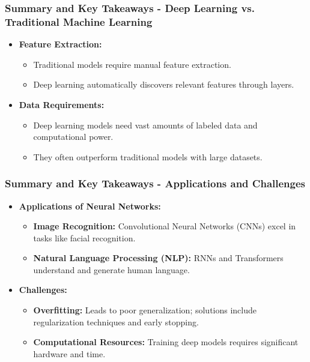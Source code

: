 \documentclass[aspectratio=169]{beamer}
\begin{document}
\begin{frame}[fragile]
  \frametitle{Summary and Key Takeaways - Deep Learning vs. Traditional Machine Learning}
  \begin{itemize}
    \item \textbf{Feature Extraction:} 
      \begin{itemize}
        \item Traditional models require manual feature extraction.
        \item Deep learning automatically discovers relevant features through layers.
      \end{itemize}
    \item \textbf{Data Requirements:} 
      \begin{itemize}
        \item Deep learning models need vast amounts of labeled data and computational power.
        \item They often outperform traditional models with large datasets.
      \end{itemize}
  \end{itemize}
\end{frame}

\begin{frame}[fragile]
  \frametitle{Summary and Key Takeaways - Applications and Challenges}
  \begin{itemize}
    \item \textbf{Applications of Neural Networks:}
    \begin{itemize}
      \item \textbf{Image Recognition:} Convolutional Neural Networks (CNNs) excel in tasks like facial recognition.
      \item \textbf{Natural Language Processing (NLP):} RNNs and Transformers understand and generate human language.
    \end{itemize}
    \item \textbf{Challenges:}
    \begin{itemize}
      \item \textbf{Overfitting:} Leads to poor generalization; solutions include regularization techniques and early stopping.
      \item \textbf{Computational Resources:} Training deep models requires significant hardware and time.
    \end{itemize}
  \end{itemize}
\end{frame}
\end{document}
